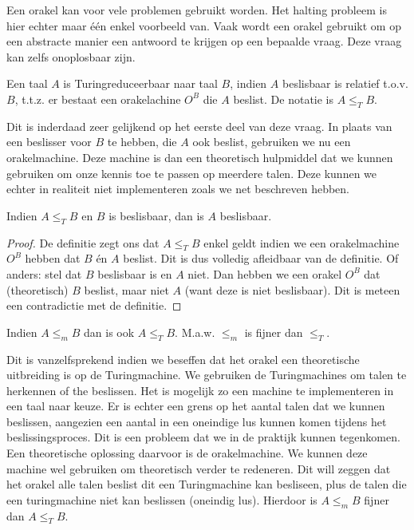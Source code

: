 Een orakel kan voor vele problemen gebruikt worden. Het halting probleem is hier echter maar \'e\'en enkel voorbeeld van. Vaak wordt een orakel gebruikt om op een abstracte manier een antwoord te krijgen op een bepaalde vraag. Deze vraag kan zelfs onoplosbaar zijn.

\begin{theorem}[Turingreduceerbaar]
	Een taal $A$ is Turingreduceerbaar naar taal $B$, indien $A$ beslisbaar is relatief t.o.v. $B$, t.t.z. er bestaat een orakelachine $O^B$ die $A$ beslist. De notatie is $A \leq_T B$.
\end{theorem}

Dit is inderdaad zeer gelijkend op het eerste deel van deze vraag. In plaats van een beslisser voor $B$ te hebben, die $A$ ook beslist, gebruiken we nu een orakelmachine. Deze machine is dan een theoretisch hulpmiddel dat we kunnen gebruiken om onze kennis toe te passen op meerdere talen. Deze kunnen we echter in realiteit niet implementeren zoals we net beschreven hebben.

\begin{theorem}
	Indien $A \leq_T B$ en $B$ is beslisbaar, dan is $A$ beslisbaar.
\end{theorem}

\begin{proof}
	De definitie zegt ons dat $A \leq_T B$ enkel geldt indien we een orakelmachine $O^B$ hebben dat $B$ \'en $A$ beslist. Dit is dus volledig afleidbaar van de definitie. Of anders: stel dat $B$ beslisbaar is en $A$ niet. Dan hebben we een orakel $O^B$ dat (theoretisch) $B$ beslist, maar niet $A$ (want deze is niet beslisbaar). Dit is meteen een contradictie met de definitie.
\end{proof}

\begin{theorem}
	Indien $A \leq_m B$ dan is ook $A \leq_T B$. M.a.w. $\leq_m$ is fijner dan $\leq_T$.
\end{theorem}

Dit is vanzelfsprekend indien we beseffen dat het orakel een theoretische uitbreiding is op de Turingmachine. We gebruiken de Turingmachines om talen te herkennen of the beslissen. Het is mogelijk zo een machine te implementeren in een taal naar keuze. Er is echter een grens op het aantal talen dat we kunnen beslissen, aangezien een aantal in een oneindige lus kunnen komen tijdens het beslissingsproces. Dit is een probleem dat we in de praktijk kunnen tegenkomen. Een theoretische oplossing daarvoor is de orakelmachine. We kunnen deze machine wel gebruiken om theoretisch verder te redeneren. Dit will zeggen dat het orakel alle talen beslist dit een Turingmachine kan besliseen, plus de talen die een turingmachine niet kan beslissen (oneindig lus). Hierdoor is $A \leq_m B$ fijner dan $A \leq_T B$.

